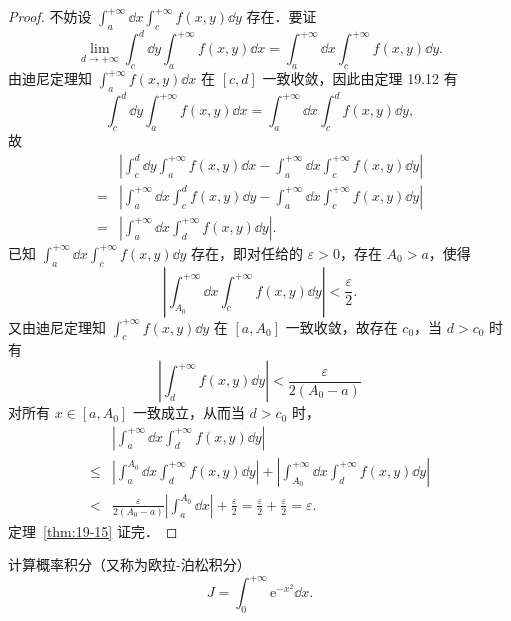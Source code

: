 \begin{proof}
不妨设 $\displaystyle\int_{a}^{+\infty}\dd x\int_{c}^{+\infty}f(x,y)\dd y$ 存在．要证
\[
\lim_{d\to+\infty}\int_{c}^{d}\dd y\int_{a}^{+\infty}f(x,y)\dd x=\int_{a}^{+\infty}\dd x\int_{c}^{+\infty}f(x,y)\dd y.
\]
由迪尼定理知 $\displaystyle\int_{a}^{+\infty}f(x,y)\dd x$ 在 $[c,d]$ 一致收敛，因此由定理 19.12 有
\[
\int_{c}^{d}\dd y\int_{a}^{+\infty}f(x,y)\dd x=\int_{a}^{+\infty}\dd x\int_{c}^{d}f(x,y)\dd y,
\]
故
\[
\begin{aligned}
&\left|\int_{c}^{d}\dd y\int_{a}^{+\infty}f(x,y)\dd x-\int_{a}^{+\infty}\dd x\int_{c}^{+\infty}f(x,y)\dd y\right|\\
={}&\left|\int_{a}^{+\infty}\dd x\int_{c}^{d}f(x,y)\dd y-\int_{a}^{+\infty}\dd x\int_{c}^{+\infty}f(x,y)\dd y\right|\\
={}&\left|\int_{a}^{+\infty}\dd x\int_{d}^{+\infty}f(x,y)\dd y\right|.
\end{aligned}
\]
已知 $\displaystyle\int_{a}^{+\infty}\dd x\int_{c}^{+\infty}f(x,y)\dd y$ 存在，即对任给的 $\varepsilon>0$，存在 $A_{0}>a$，使得
\[
\left|\int_{A_{0}}^{+\infty}\dd x\int_{c}^{+\infty}f(x,y)\dd y\right|<\frac{\varepsilon}{2}.
\]
又由迪尼定理知 $\displaystyle\int_{c}^{+\infty}f(x,y)\dd y$ 在 $[a,A_{0}]$ 一致收敛，故存在 $c_{0}$，当 $d>c_{0}$ 时有
\[
\left|\int_{d}^{+\infty}f(x,y)\dd y\right|<\frac{\varepsilon}{2(A_{0}-a)}
\]
对所有 $x\in[a,A_{0}]$ 一致成立，从而当 $d>c_{0}$ 时，
\[
\begin{aligned}
&\left|\int_{a}^{+\infty}\dd x\int_{d}^{+\infty}f(x,y)\dd y\right|\\
\leqslant{}&\left|\int_{a}^{A_{0}}\dd x\int_{d}^{+\infty}f(x,y)\dd y\right|+\left|\int_{A_{0}}^{+\infty}\dd x\int_{d}^{+\infty}f(x,y)\dd y\right|\\
<{}&\frac{\varepsilon}{2(A_{0}-a)}\left|\int_{a}^{A_{0}}\dd x\right|+\frac{\varepsilon}{2}=\frac{\varepsilon}{2}+\frac{\varepsilon}{2}=\varepsilon.
\end{aligned}
\]
定理~\ref{thm:19-15} 证完．
\end{proof}

\begin{example}\label{ex:19-2-7}
计算概率积分（又称为欧拉-泊松积分）
\[
J=\int_{0}^{+\infty}\mathrm{e}^{-x^{2}}\dd x.
\]
\end{example}


